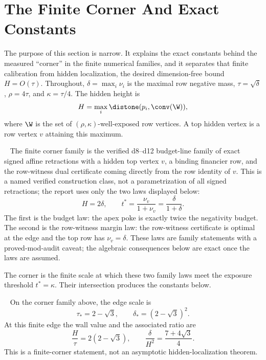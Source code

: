 \section{The Finite Corner And Exact Constants}\label{sec:corner-theorem}

The purpose of this section is narrow.  It explains the exact constants behind
the measured ``corner'' in the finite numerical families, and it separates that
finite calibration from hidden localization, the desired dimension-free bound
\(H=O(\tau)\).  Throughout, \(\delta=\max_i\nu_i\) is the maximal row negative
mass, \(\tau=\sqrt\delta\), \(\rho=4\tau\), and \(\kappa=\tau/4\).  The hidden
height is
\[
  H=\max_i \distone(p_i,\conv(\W)),
\]
where \(\W\) is the set of \((\rho,\kappa)\)-well-exposed row vertices.  A top
hidden vertex is a row vertex \(v\) attaining this maximum.

\begin{definition}
\modauditbadge\ \numbadge
The finite corner family is the verified d8--d12 budget-line family of exact
signed affine retractions with a hidden top vertex \(v\), a binding financier
row, and the row-witness dual certificate coming directly from the row identity
of \(v\).  This is a named verified construction class, not a parametrization
of all signed retractions; the report uses only the two laws displayed below:
\[
  H=2\delta,
  \qquad
  t^*=\frac{\nu_v}{1+\nu_v}=\frac{\delta}{1+\delta}.
\]
The first is the budget law: the apex poke is exactly twice the negativity
budget.  The second is the row-witness margin law: the row-witness certificate
is optimal at the edge and the top row has \(\nu_v=\delta\).  These laws are
family statements with a proved-mod-audit caveat; the algebraic consequences
below are exact once the laws are assumed.
\end{definition}

The corner is the finite scale at which these two family laws meet the exposure
threshold \(t^*=\kappa\).  Their intersection produces the constants below.

\begin{theorem}
\modauditbadge\ \numbadge
On the corner family above, the edge scale is
\[
  \tau_* = 2-\sqrt 3,\qquad
  \delta_*=(2-\sqrt 3)^2.
\]
At this finite edge the wall value and the associated ratio are
\[
  \frac{H}{\tau}=2(2-\sqrt 3),
  \qquad
  \frac{\delta}{H^2}=\frac{7+4\sqrt 3}{4}.
\]
This is a finite-corner statement, not an asymptotic hidden-localization
theorem.
\end{theorem}

